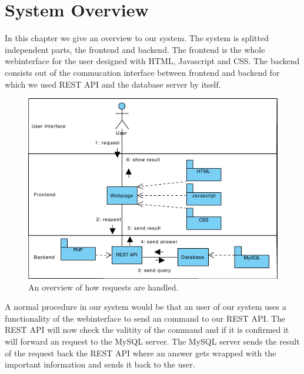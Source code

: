 \chapter{System Overview}
In this chapter we give an overview to our system. The system is splitted independent parts, the frontend and backend. The frontend is the whole webinterface for the user designed with HTML, Javascript and CSS. The backend consists out of the commucation interface between frontend and backend for which we used REST API and the database server by itself.

\begin{figure}[hb]
	\centering
		\includegraphics[scale=1.5]{content/graphics/system_overview.pdf}
	\caption{An overview of how requests are handled.}
    \label{fig:system_overview}
\end{figure}

A normal procedure in our system would be that an user of our system uses a functionality of the webinterface to send an command to our REST API. The REST API will now check the valitity of the command and if it is confirmed it will forward an request to the MySQL server. The MySQL server sends the result of the request back the REST API where an answer gets wrapped with the important information and sends it back to the user.
